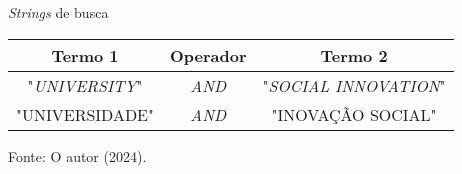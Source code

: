 \begin{quadro}[H]
\centering
\caption {\textit{Strings} de busca}
\begin{tabular}{|c|c|c|}
\hline
\rowcolor[HTML]{C0C0C0} 
\textbf{Termo 1} & \textbf{Operador} & \textbf{Termo 2}    \\ \hline
"\textit{UNIVERSITY}"     & \textit{AND}               & "\textit{SOCIAL INNOVATION}" \\ \hline
"UNIVERSIDADE"   & \textit{AND}               & "INOVAÇÃO SOCIAL"   \\ \hline
\end{tabular}
Fonte: O autor (2024).
\end{quadro}